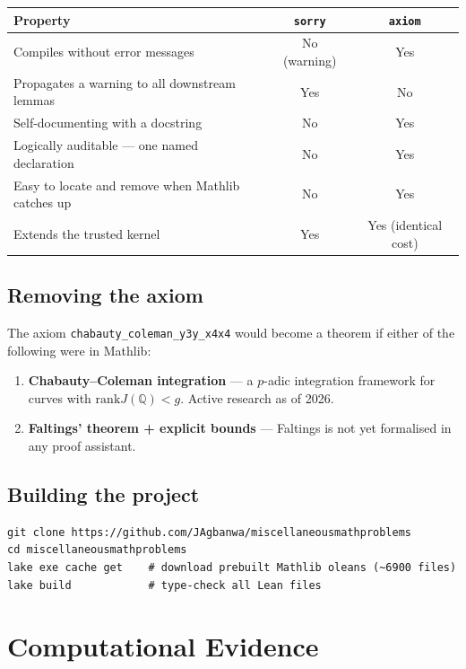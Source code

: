 \documentclass[12pt, a4paper]{article}
\theoremstyle{definition}
\newcommand{\Q}{\mathbb{Q}}
\newcommand{\rank}{\mathrm{rank}}
\begin{document}
\begin{center}
\renewcommand{\arraystretch}{1.2}
\begin{tabular}{lcc}
\toprule
Property & \texttt{sorry} & \texttt{axiom} \\
\midrule
Compiles without error messages & No (warning) & Yes \\
Propagates a warning to all downstream lemmas & Yes & No \\
Self-documenting with a docstring & No & Yes \\
Logically auditable --- one named declaration & No & Yes \\
Easy to locate and remove when Mathlib catches up & No & Yes \\
Extends the trusted kernel & Yes & Yes (identical cost) \\
\bottomrule
\end{tabular}
\end{center}

\subsection{Removing the axiom}

The axiom \texttt{chabauty\_coleman\_y3y\_x4x4} would become a theorem if
either of the following were in Mathlib:
\begin{enumerate}[noitemsep]
  \item \textbf{Chabauty--Coleman integration} --- a $p$-adic integration
        framework for curves with $\rank J(\Q) < g$.  Active research as of 2026.
  \item \textbf{Faltings' theorem + explicit bounds} --- Faltings is not yet
        formalised in any proof assistant.
\end{enumerate}

\subsection{Building the project}

\begin{lstlisting}[language={}]
git clone https://github.com/JAgbanwa/miscellaneousmathproblems
cd miscellaneousmathproblems
lake exe cache get    # download prebuilt Mathlib oleans (~6900 files)
lake build            # type-check all Lean files
\end{lstlisting}

\section{Computational Evidence}\label{sec:computation}
\end{document}

